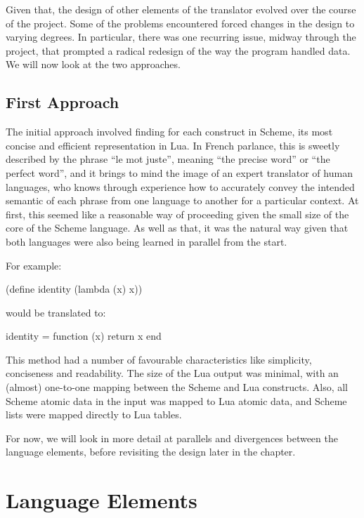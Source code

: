 Given that, the design of other elements of the translator evolved over the
course of the project. Some of the problems encountered forced changes in the
design to varying degrees. In particular, there was one recurring issue, midway
through the project, that prompted a radical redesign of the way the program
handled data.  We will now look at the two approaches.

\subsection{First Approach}

The initial approach involved finding for each construct in Scheme, its most
concise and efficient representation in Lua. In French parlance, this is sweetly
described by the phrase ``le mot juste'', meaning ``the precise word'' or ``the
perfect word'', and it brings to mind the image of an expert translator of
human languages, who knows through experience how to accurately convey the
intended semantic of each phrase from one language to another for a particular
context.  At first, this seemed like a reasonable way of proceeding given the
small size of the core of the Scheme language. As well as that, it was the
natural way given that both languages were also being learned in parallel from
the start.

\begin{framed}
For example:
\begin{center}\ttfamily (define identity (lambda (x) x))\end{center}

would be translated to:
\begin{center}\ttfamily identity = function (x) return x end\end{center}
\end{framed}

This method had a number of favourable characteristics like simplicity,
conciseness and readability. The size of the Lua output was minimal, with an
(almost) one-to-one mapping between the Scheme and Lua constructs. Also, all
Scheme atomic data in the input was mapped to Lua atomic data, and Scheme lists
were mapped directly to Lua tables.

For now, we will look in more detail at parallels and divergences between the
language elements, before revisiting the design later in the chapter.


\section{Language Elements}

